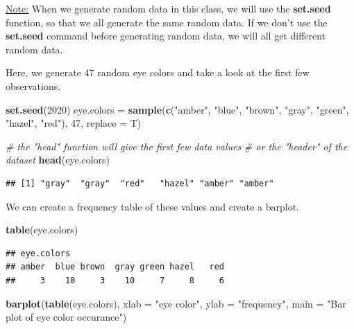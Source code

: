 \documentclass[
  11pt,
  oneside]{book}
\newenvironment{Shaded}{\begin{snugshade}}{\end{snugshade}}
\newcommand{\AttributeTok}[1]{\textcolor[rgb]{0.13,0.29,0.53}{#1}}
\newcommand{\CommentTok}[1]{\textcolor[rgb]{0.56,0.35,0.01}{\textit{#1}}}
\newcommand{\DecValTok}[1]{\textcolor[rgb]{0.00,0.00,0.81}{#1}}
\newcommand{\FunctionTok}[1]{\textcolor[rgb]{0.13,0.29,0.53}{\textbf{#1}}}
\newcommand{\NormalTok}[1]{#1}
\newcommand{\OtherTok}[1]{\textcolor[rgb]{0.56,0.35,0.01}{#1}}
\newcommand{\StringTok}[1]{\textcolor[rgb]{0.31,0.60,0.02}{#1}}
\theoremstyle{definition}
\theoremstyle{definition}
\theoremstyle{definition}
\theoremstyle{definition}
\theoremstyle{remark}
\begin{document}
\underline{Note:} When we generate random data in this class, we will use the \textbf{set.seed} function, so that we all generate the same random data. If we don't use the \textbf{set.seed} command before generating random data, we will all get different random data.

Here, we generate 47 random eye colors and take a look at the first few observations.

\begin{Shaded}
\begin{Highlighting}[]
\FunctionTok{set.seed}\NormalTok{(}\DecValTok{2020}\NormalTok{)}
\NormalTok{eye.colors }\OtherTok{=} \FunctionTok{sample}\NormalTok{(}\FunctionTok{c}\NormalTok{(}\StringTok{"amber"}\NormalTok{, }\StringTok{"blue"}\NormalTok{, }\StringTok{"brown"}\NormalTok{, }\StringTok{"gray"}\NormalTok{, }\StringTok{"green"}\NormalTok{,}
                       \StringTok{"hazel"}\NormalTok{, }\StringTok{"red"}\NormalTok{), }\DecValTok{47}\NormalTok{, }\AttributeTok{replace =}\NormalTok{ T)}

\CommentTok{\# the "head" function will give the first few data values }
\CommentTok{\# or the "header" of the dataset}
\FunctionTok{head}\NormalTok{(eye.colors)}
\end{Highlighting}
\end{Shaded}

\begin{verbatim}
## [1] "gray"  "gray"  "red"   "hazel" "amber" "amber"
\end{verbatim}

We can create a frequency table of these values and create a barplot.

\begin{Shaded}
\begin{Highlighting}[]
\FunctionTok{table}\NormalTok{(eye.colors)}
\end{Highlighting}
\end{Shaded}

\begin{verbatim}
## eye.colors
## amber  blue brown  gray green hazel   red 
##     3    10     3    10     7     8     6
\end{verbatim}

\begin{Shaded}
\begin{Highlighting}[]
\FunctionTok{barplot}\NormalTok{(}\FunctionTok{table}\NormalTok{(eye.colors), }\AttributeTok{xlab =} \StringTok{"eye color"}\NormalTok{, }
        \AttributeTok{ylab =} \StringTok{"frequency"}\NormalTok{, }\AttributeTok{main =} \StringTok{"Bar plot of eye color occurance"}\NormalTok{)}
\end{Highlighting}
\end{Shaded}
\end{document}
